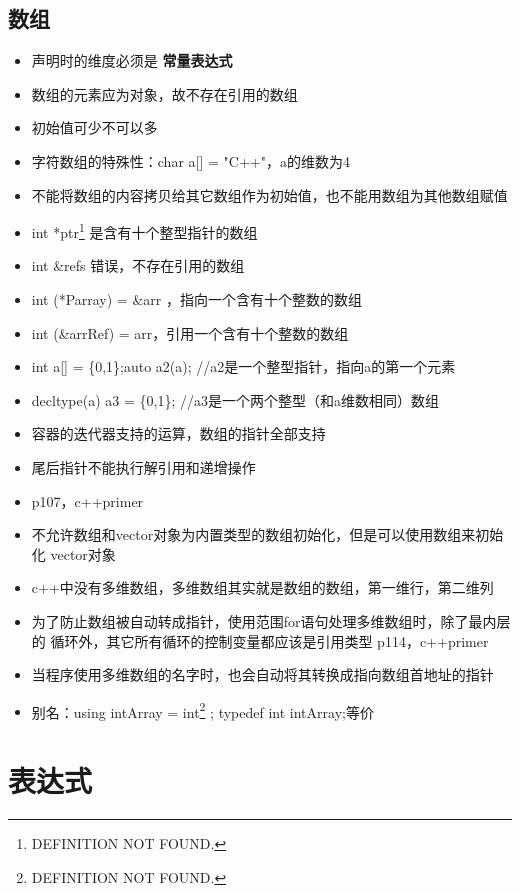 \documentclass[11pt]{article}
\begin{document}
\subsection{数组}
\label{sec-1-3}
\begin{itemize}
\item 声明时的维度必须是 \textbf{常量表达式}
\item 数组的元素应为对象，故不存在引用的数组
\item 初始值可少不可以多
\item 字符数组的特殊性：char a[] = "C++"，a的维数为4
\item 不能将数组的内容拷贝给其它数组作为初始值，也不能用数组为其他数组赋值
\item int *ptr\footnote{DEFINITION NOT FOUND.} 是含有十个整型指针的数组
\item int \&refs\footnotemark[1]{} 错误，不存在引用的数组
\item int (*Parray)\footnotemark[1]{} = \&arr ，指向一个含有十个整数的数组
\item int (\&arrRef)\footnotemark[1]{} = arr，引用一个含有十个整数的数组
\item int a[] = \{0,1\};auto a2(a); //a2是一个整型指针，指向a的第一个元素
\item decltype(a) a3 = \{0,1\}; //a3是一个两个整型（和a维数相同）数组
\item 容器的迭代器支持的运算，数组的指针全部支持
\item 尾后指针不能执行解引用和递增操作
\item p107，c++primer
\item 不允许数组和vector对象为内置类型的数组初始化，但是可以使用数组来初始化
vector对象
\item c++中没有多维数组，多维数组其实就是数组的数组，第一维行，第二维列
\item 为了防止数组被自动转成指针，使用范围for语句处理多维数组时，除了最内层的
循环外，其它所有循环的控制变量都应该是引用类型 p114，c++primer
\item 当程序使用多维数组的名字时，也会自动将其转换成指向数组首地址的指针
\item 别名：using intArray = int\footnote{DEFINITION NOT FOUND.} ; typedef int intArray\footnotemark[2]{};等价
\end{itemize}

\section{表达式}
\label{sec-2}
\end{document}
